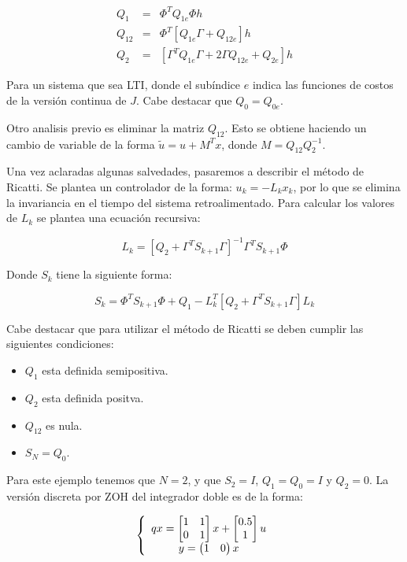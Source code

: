 \begin{equation}
    \begin{array}{ccc}
        Q_1 & = & \Phi^TQ_{1e}\Phi h \\
        Q_{12} & = & \Phi^T[Q_{1e}\Gamma + Q_{12e}]h \\ 
        Q_2 & = & [\Gamma^TQ_{1e}\Gamma + 2\Gamma Q_{12e} + Q_{2e}]h
    \end{array}
\end{equation}

Para un sistema que sea LTI, donde el subíndice $e$ indica las funciones de costos de la versión continua de $J$.
Cabe destacar que $Q_0=Q_{0e}$. 

Otro analisis previo es eliminar la matriz $Q_{12}$. Esto se obtiene haciendo un cambio de variable de 
la forma $\tilde{u} = u + M^T x$, donde $M=Q_{12}Q_2^{-1}$.

Una vez aclaradas algunas salvedades, pasaremos a describir el método de Ricatti. 
Se plantea un controlador de la forma: $u_k = -L_kx_k$, por lo que 
se elimina la invariancia en el tiempo del sistema retroalimentado. Para calcular los 
valores de $L_k$ se plantea una ecuación recursiva: 

\begin{equation}
    L_k = [Q_2 + \Gamma^TS_{k+1}\Gamma]^{-1}\Gamma^TS_{k+1}\Phi
\end{equation}

Donde $S_k$ tiene la siguiente forma: 

\begin{equation}
    S_k = 
    \Phi^T S_{k+1} \Phi + Q_1 -
    L^T_k[ Q_2 + \Gamma^TS_{k+1}\Gamma ]L_k
\end{equation}

Cabe destacar que para utilizar el método de Ricatti se deben cumplir las siguientes condiciones: 

\begin{itemize}
    \item $Q_1$ esta definida semipositiva. 
    \item $Q_2$ esta definida positva. 
    \item $Q_{12}$ es nula. 
    \item $S_N=Q_0$.
\end{itemize}

Para este ejemplo tenemos que $N=2$, y que $S_2=I$, $Q_1=Q_0=I$ y $Q_2=0$. La versión discreta por ZOH del integrador doble es de la forma: 

\begin{equation}
    \left\{ \begin{array}{c} 
        qx = \begin{bmatrix}
            1 & 1 \\ 
            0 & 1 \\
        \end{bmatrix}x + \begin{bmatrix}
            0.5 \\ 1 \\ 
        \end{bmatrix}u \\ 
        y = \begin{pmatrix}
            1 & 0
        \end{pmatrix}x
     \end{array} \right.
\end{equation}

